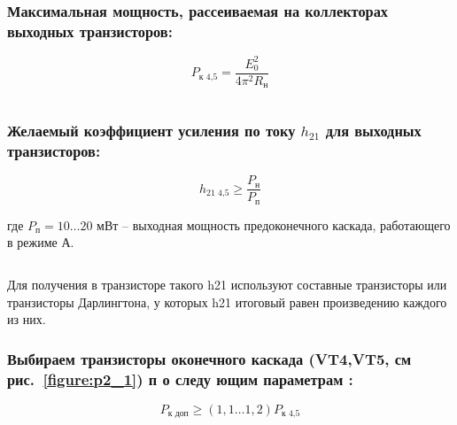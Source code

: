 \begin{equation*}
 
\end{equation*}

\subsubsection{Максимальная мощность, рассеиваемая на коллекторах выходных транзисторов:}

\begin{equation}
\label{eq:equation2_5}
 P_{\text{к 4,5}} = \dfrac{E_0^2}{4 \pi^2 R_{\text{н}}}
\end{equation}

\begin{equation*}
 
\end{equation*}

\subsubsection{Желаемый коэффициент усиления по току $h_{21}$ для выходных транзисторов:}

\begin{equation}
\label{eq:equation2_6}
 h_{\text{21 4,5}} \geq \dfrac{P_{\text{н}}}{P_{\text{п}}}
\end{equation}

\noindent где $ P_{\text{п}} = 10 \ldots 20 $ мВт -- выходная мощность предоконечного каскада, работающего в режиме А.\par	

\begin{equation*}
 
\end{equation*}

Для получения в транзисторе такого h21 используют составные транзисторы или транзисторы Дарлингтона, у которых h21 итоговый равен произведению каждого из них.

\subsubsection{Выбираем транзисторы оконечного каскада (VT4,VT5, см рис.~\ref{figure:p2_1}) п о следу ющим параметрам :}

\begin{equation}
\label{eq:equation2_7}
 P_{\text{к доп}}  \geq (1,1 \ldots 1,2) P_{\text{к 4,5}}
\end{equation}
\begin{equation*}
 
\end{equation*}

